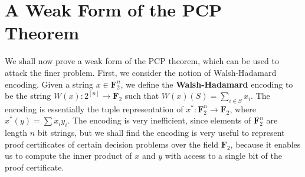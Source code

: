 \section{A Weak Form of the PCP Theorem}

We shall now prove a weak form of the PCP theorem, which can be used to attack the finer problem. First, we consider the notion of Walsh-Hadamard encoding. Given a string $x \in \mathbf{F}_2^n$, we define the {\bf Walsh-Hadamard} encoding to be the string $W(x): 2^{[n]} \to \mathbf{F}_2$ such that $W(x)(S) = \sum_{i \in S} x_i$. The encoding is essentially the tuple representation of $x^*: \mathbf{F}_2^n \to \mathbf{F}_2$, where $x^*(y) = \sum x_i y_i$. The encoding is very inefficient, since elements of $\mathbf{F}_2^n$ are length $n$ bit strings, but we shall find the encoding is very useful to represent proof certificates of certain decision problems over the field $\mathbf{F}_2$, because it enables us to compute the inner product of $x$ and $y$ with access to a single bit of the proof certificate.

